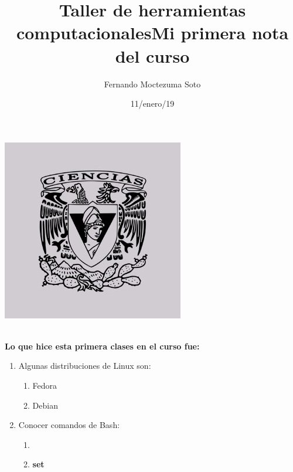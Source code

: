 \documentclass[etterpaper,12pt,oneside]{article}%
\title{\Huge Taller de herramientas computacionales}
\author{Fernando Moctezuma Soto}
\date{11/enero/19}
\begin{document}
	\maketitle
	
	\begin{center}
		\includegraphics[scale=0.40]{1.jpg}
	\end{center}

	\newpage
	
	\title{\Huge Mi primera nota del curso}\\
	
	\textbf{Lo que hice esta primera clases en el curso fue:}
	
	\begin{enumerate}
		
		\item Algunas distribuciones de Linux son:
		\begin{enumerate}
			\item Fedora
			\item Debian
		\end{enumerate}
	
		\item Conocer comandos de Bash:
		\begin{enumerate}
			\item\color{red}{set}
			\item\color{magenta}\textbf{set}
		\end{enumerate}
	
	\end{enumerate}
	
\end{document}
